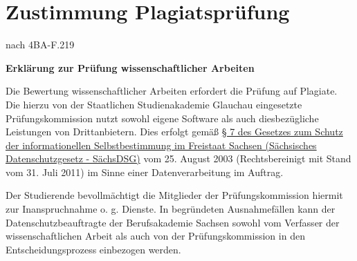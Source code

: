 \chapter{Zustimmung Plagiatsprüfung}

    \vspace*{2mm}

    \begin{minipage}{0.5\columnwidth}
        
    \end{minipage}
    \begin{minipage}{0.45\columnwidth}
        \begin{flushright}
            {\small nach 4BA-F.219\\}
        \end{flushright}
    \end{minipage}
    \vspace*{2mm}

    \begin{center}
        \textbf{\huge{Erklärung zur Prüfung wissenschaftlicher Arbeiten}}
    \end{center}

    Die Bewertung wissenschaftlicher Arbeiten erfordert die Prüfung auf Plagiate. Die hierzu von der Staatlichen Studienakademie Glauchau eingesetzte Prüfungskommission nutzt sowohl eigene Software als auch diesbezügliche Leistungen von Drittanbietern. Dies erfolgt gemäß \href{https://www.revosax.sachsen.de/vorschrift/1672-Saechsisches-Datenschutzgesetz#p7}{§ 7 des Gesetzes zum Schutz der informationellen Selbstbestimmung im Freistaat Sachsen (Sächsisches Datenschutzgesetz - SächsDSG)} vom 25. August 2003 (Rechtsbereinigt mit Stand vom 31. Juli 2011) im Sinne einer Datenverarbeitung im Auftrag.

    Der Studierende bevollmächtigt die Mitglieder der Prüfungskommission hiermit zur Inanspruchnahme o. g. Dienste. In begründeten Ausnahmefällen kann der Datenschutzbeauftragte der Berufsakademie Sachsen sowohl vom Verfasser der wissenschaftlichen Arbeit als auch von der Prüfungskommission in den Entscheidungsprozess einbezogen werden.


